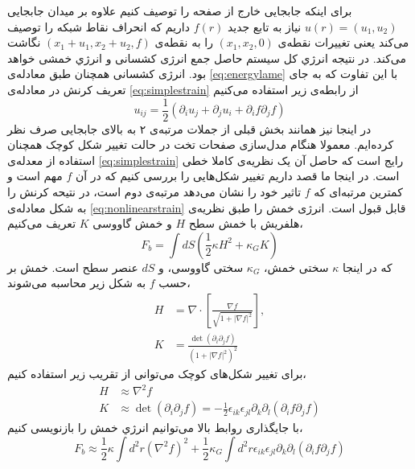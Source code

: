 
برای اینکه جابجایی خارج از صفحه را توصیف کنیم علاوه بر میدان جابجایی 
$u(r)=(u_1,u_2)$
نیاز به تابع جدید 
$f(r)$
داریم که انحراف
 نقاط شبکه را توصیف می‌کند یعنی تغییرات نقطه‌ی 
$(x_1,x_2,0)$
را به نقطه‌ی 
$(x_1+u_1,x_2+u_2,f)$
نگاشت می‌کند. در نتیجه انرژي کل سیستم حاصل جمع انرژی کشسانی و انرژي خمشی خواهد بود. انرژی کشسانی همچنان طبق معادله‌ی
\ref{eq:energylame}
با این تفاوت که به جای تعریف کرنش در معادله‌ی 
\ref{eq:simplestrain}
از رابطه‌ی زیر استفاده می‌کنیم
\begin{equation}
u_{ij}=\frac{1}{2}(\partial_iu_j+\partial_ju_i+\partial_if\partial_jf)
\label{eq:nonlinearstrain}
\end{equation}
در اینجا نیز همانند بخش قبلی از جملات مرتبه‌ی ۲ به بالای جابجایی صرف نظر کرده‌ایم. معمولا هنگام  مدل‌سازی صفحات تخت در حالت تغییر شکل کوچک همچنان استفاده از معدله‌ی 
\ref{eq:simplestrain}
رایج است که حاصل آن یک نظریه‌ی کاملا خطی است. در اینجا ما قصد داریم تغییر شکل‌هایی را بررسی کنیم که در آن $f$ مهم است و کمترین مرتبه‌ای که $f$ 
تاثیر خود را نشان می‌دهد مرتبه‌ی دوم است، در نتیحه کرنش را به شکل  معادله‌ی 
\ref{eq:nonlinearstrain}
قابل قبول است. انرژی خمش را طبق نظریه‌ی هلفریش
\cite{Helfrich1973}
با خمش سطح $H$
و خمش گاووسی $K$
تعریف می‌کنیم، 
\begin{equation}
F_b=\int dS\left(\frac{1}{2}\kappa H^2+\kappa_GK\right)
\end{equation}
که در اینجا 
$\kappa$
سختی خمش، 
$\kappa_G$
سختی گاووسی، و 
$dS$
عنصر سطح است. خمش بر حسب 
$f$
 به شکل زیر محاسبه می‌شوند،
\begin{equation}
\begin{aligned}
H&=\nabla\cdot\left[\frac{\nabla f}{\sqrt{1+|\nabla f|^2}}\right],\\
K&=\frac{\det(\partial_i\partial_jf)}{\left(1+|\nabla f|^2\right)^2}
\end{aligned}
\end{equation}
برای تغییر شکل‌های کوچک می‌توانی از تقریب زیر استفاده کنیم،
\begin{equation}
\begin{aligned}
H&\approx\nabla^2f\\
K&\approx \det(\partial_i\partial_jf)=-\frac{1}{2}\epsilon_{ik}\epsilon_{jl}\partial_k\partial_l(\partial_if\partial_jf)
\end{aligned}
\end{equation}
با جایگذاری روابط بالا می‌توانیم انرژي خمش را بازنویسی کنیم،
\begin{equation}
F_b\approx\frac{1}{2}\kappa\int d^2r(\nabla^2 f)^2+\frac{1}{2}\kappa_G\int d^2r\epsilon_{ik}\epsilon_{jl}\partial_k\partial_l(\partial_if\partial_jf)
\label{eq:bendingenergyequ}
\end{equation}
